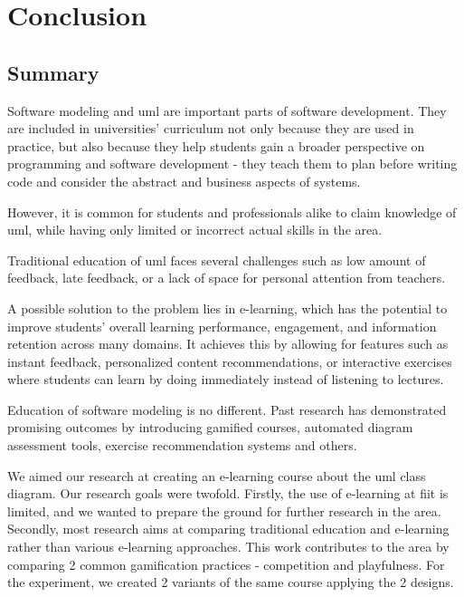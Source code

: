 \chapter{Conclusion \label{cha:conclusion}}

\section{Summary}

Software modeling and \ac{uml} are important parts of software development. They are included in universities' curriculum not only because they are used in practice, but also because they help students gain a broader perspective on programming and software development - they teach them to plan before writing code and consider the abstract and business aspects of systems.

However, it is common for students and professionals alike to claim knowledge of \ac{uml}, while having only limited or incorrect actual skills in the area.

Traditional education of \ac{uml} faces several challenges such as low amount of feedback, late feedback, or a lack of space for personal attention from teachers.

A possible solution to the problem lies in e-learning, which has the potential to improve students' overall learning performance, engagement, and information retention across many domains. It achieves this by allowing for features such as instant feedback, personalized content recommendations, or interactive exercises where students can learn by doing immediately instead of listening to lectures.



Education of software modeling is no different. Past research has demonstrated promising outcomes by introducing gamified courses, automated diagram assessment tools, exercise recommendation systems and others.

We aimed our research at creating an e-learning course about the \ac{uml} class diagram. Our research goals were twofold. Firstly, the use of e-learning at \ac{fiit} is limited, and we wanted to prepare the ground for further research in the area. Secondly, most research aims at comparing traditional education and e-learning rather than various e-learning approaches. This work contributes to the area by comparing 2 common gamification practices - competition and playfulness. For the experiment, we created 2 variants of the same course applying the 2 designs.

